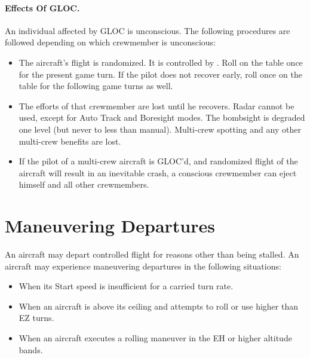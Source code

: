 \paragraph{Effects Of GLOC.} An individual affected by GLOC is unconscious. The following procedures are followed depending on which crewmember is unconscious:

\begin{itemize}

    \item{} The aircraft's flight is randomized. It is controlled by . Roll on the table once for the present game turn. If the pilot does not recover early, roll once on the table for the following game turns as well.

    \item{} The efforts of that crewmember are lost until he recovers. Radar cannot be used, except for Auto Track and Boresight modes. The bombsight is degraded one level (but never to less than manual). Multi-crew spotting and any other multi-crew benefits are lost.

    \item{} If the pilot of a multi-crew aircraft is GLOC'd, and randomized flight of the aircraft will result in an inevitable crash, a conscious crewmember can eject himself and all other crewmembers.

\end{itemize}

\section{Maneuvering Departures}

An aircraft may depart controlled flight for reasons other than being stalled. An aircraft may experience maneuvering departures in the following situations:

\begin{itemize}

    \item When its Start speed is insufficient for a carried turn rate.


    \item When an aircraft is above its ceiling and attempts to roll or use higher than EZ turns.

    \item When an aircraft executes a rolling maneuver in the EH or higher altitude bands.

\end{itemize}

